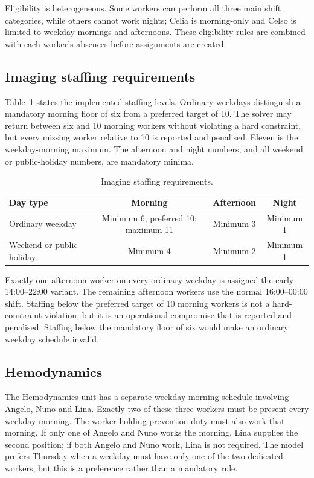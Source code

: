 \documentclass[11pt,a4paper]{article}
\begin{document}
Eligibility is heterogeneous. Some workers can perform all three main shift categories, while others cannot work nights; Celia is morning-only and Celso is limited to weekday mornings and afternoons. These eligibility rules are combined with each worker's absences before assignments are created.

\subsection{Imaging staffing requirements}

Table~\ref{tab:problem-coverage} states the implemented staffing levels. Ordinary weekdays distinguish a mandatory morning floor of six from a preferred target of 10. The solver may return between six and 10 morning workers without violating a hard constraint, but every missing worker relative to 10 is reported and penalised. Eleven is the weekday-morning maximum. The afternoon and night numbers, and all weekend or public-holiday numbers, are mandatory minima.

\begin{table}[H]
\centering
\caption{Imaging staffing requirements.}
\label{tab:problem-coverage}
\begin{tabularx}{\textwidth}{Xccc}
\toprule
Day type & Morning & Afternoon & Night \\
\midrule
Ordinary weekday & Minimum 6; preferred 10; maximum 11 & Minimum 3 & Minimum 1 \\
Weekend or public holiday & Minimum 4 & Minimum 2 & Minimum 1 \\
\bottomrule
\end{tabularx}
\end{table}

Exactly one afternoon worker on every ordinary weekday is assigned the early 14:00--22:00 variant. The remaining afternoon workers use the normal 16:00--00:00 shift. Staffing below the preferred target of 10 morning workers is not a hard-constraint violation, but it is an operational compromise that is reported and penalised. Staffing below the mandatory floor of six would make an ordinary weekday schedule invalid.

\subsection{Hemodynamics}

The Hemodynamics unit has a separate weekday-morning schedule involving Angelo, Nuno and Lina. Exactly two of these three workers must be present every weekday morning. The worker holding prevention duty must also work that morning. If only one of Angelo and Nuno works the morning, Lina supplies the second position; if both Angelo and Nuno work, Lina is not required. The model prefers Thursday when a weekday must have only one of the two dedicated workers, but this is a preference rather than a mandatory rule.
\end{document}
